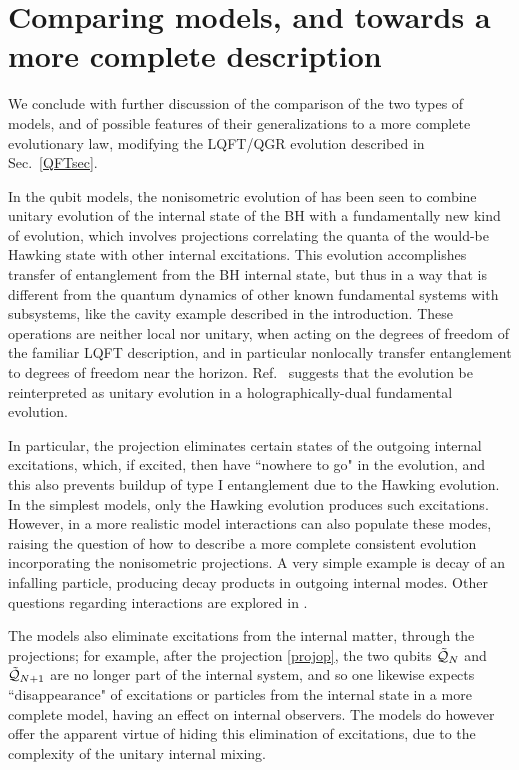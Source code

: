 \documentclass[12pt]{article}
\numberwithin{equation}{section}
\newcommand{\calq}{{\cal Q}}
\begin{document}
\section{Comparing models, and towards a more complete description}

We conclude with further discussion of the comparison of the two types of models, and  of possible features of their generalizations to a more complete evolutionary law, modifying the LQFT/QGR evolution described in Sec.~\ref{QFTsec}.  

In the qubit models, the nonisometric evolution of \cite{AEHPV} has been seen to combine unitary evolution of the internal state of the BH with a fundamentally new kind of evolution, which involves projections correlating the quanta of the would-be Hawking state with other internal excitations.  This evolution accomplishes transfer of entanglement from the BH internal state, but thus in a way that is different from the quantum dynamics of other known fundamental systems with subsystems, like the cavity example described in the introduction. 
These operations are neither local nor unitary, when acting on the degrees of freedom  of the familiar LQFT description, and in particular nonlocally transfer entanglement to degrees of freedom near the horizon.  
Ref.~\cite{AEHPV} suggests that the evolution be reinterpreted as unitary evolution in a holographically-dual fundamental evolution.   

In particular, the projection eliminates certain states of the outgoing internal excitations, which, if excited, then have ``nowhere to go" in the evolution, and this also prevents buildup of type I entanglement due to the Hawking evolution.  In the simplest models, only the Hawking evolution produces such excitations.  However, in a more realistic model interactions can also populate these modes, raising the question of how to describe a more complete consistent evolution incorporating the nonisometric projections.  A very simple example\cite{SE2d} is decay of an infalling particle, producing decay products in outgoing internal modes.  Other questions regarding interactions are explored in \cite{KiPr}.

The models also eliminate excitations from the internal matter, through the projections; for example, after the projection \eqref{projop}, the two qubits $\tilde \calq_N$ and $\tilde \calq_{N+1}$ 
are no longer part of the internal system, and so one likewise expects ``disappearance" of excitations or particles from the internal state in a more complete model, having an effect on internal observers.  The models do however offer the apparent virtue of hiding this elimination of excitations, due to the complexity of the unitary internal mixing\cite{AEHPV}.
\end{document}
